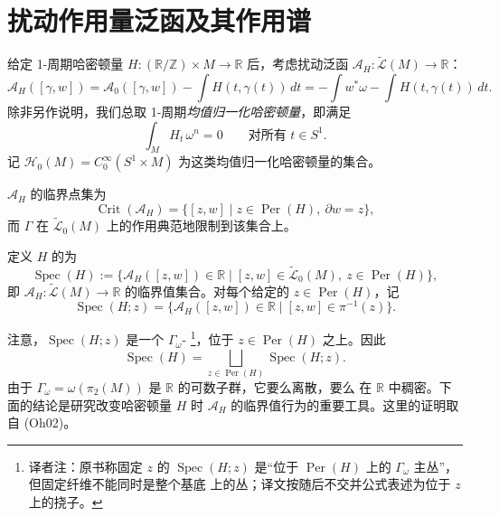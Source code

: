 \section{扰动作用量泛函及其作用谱}
\label{sec:perturbed-action-functionals-spectrum}

给定 1-周期哈密顿量 $H:(\mathbb R/\mathbb Z)\times M\to\mathbb R$ 后，考虑扰动泛函
$\mathcal A_H:\widetilde{\mathcal L}(M)\to\mathbb R$：
\begin{equation}
 \mathcal A_H([\gamma,w])
 =\mathcal A_0([\gamma,w])-\int H(t,\gamma(t))\,dt
 =-\int w^*\omega-\int H(t,\gamma(t))\,dt.
 \label{eq:18-perturbed-action-functional}
\end{equation}
除非另作说明，我们总取 1-周期\emph{均值归一化哈密顿量}，即满足
\begin{equation}
 \int_M H_t\,\omega^n=0\qquad\text{对所有 }t\in S^1.
 \label{eq:18-mean-normalized-hamiltonian}
\end{equation}
记 $\mathcal H_0(M)=C_0^\infty(S^1\times M)$ 为这类均值归一化哈密顿量的集合。

\begin{lemma}
\label{lem:18-critical-points-perturbed-action}
$\mathcal A_H$ 的临界点集为
\[
 \operatorname{Crit}(\mathcal A_H)
 =\{[z,w]\mid z\in\operatorname{Per}(H),\ \partial w=z\},
\]
而 $\Gamma$ 在 $\widetilde{\mathcal L}_0(M)$ 上的作用典范地限制到该集合上。
\end{lemma}

\begin{definition}
\label{def:18-action-spectrum}
定义 $H$ 的\emph{\termActionSpectrum{}}为
\[
 \operatorname{Spec}(H):=\{\mathcal A_H([z,w])\in\mathbb R\mid
 [z,w]\in\widetilde{\mathcal L}_0(M),\ z\in\operatorname{Per}(H)\},
\]
即 $\mathcal A_H:\widetilde{\mathcal L}(M)\to\mathbb R$ 的临界值集合。对每个给定的
$z\in\operatorname{Per}(H)$，记
\[
 \operatorname{Spec}(H;z)=\{\mathcal A_H([z,w])\in\mathbb R\mid
 [z,w]\in\pi^{-1}(z)\}.
\]
\end{definition}

注意，$\operatorname{Spec}(H;z)$ 是一个 $\Gamma_\omega$-\termTorsor{}
\footnote{译者注：原书称固定 $z$ 的 $\operatorname{Spec}(H;z)$ 是“位于
$\operatorname{Per}(H)$ 上的 $\Gamma_\omega$ 主丛”，但固定纤维不能同时是整个基底
上的丛；译文按随后不交并公式表述为位于 $z$ 上的挠子。}，位于
$z\in\operatorname{Per}(H)$ 之上。因此
\[
 \operatorname{Spec}(H)=\bigsqcup_{z\in\operatorname{Per}(H)}
 \operatorname{Spec}(H;z).
\]
由于 $\Gamma_\omega=\omega(\pi_2(M))$ 是 $\mathbb R$ 的可数子群，它要么离散，要么
在 $\mathbb R$ 中稠密。下面的结论是研究改变哈密顿量 $H$ 时
$\mathcal A_H$ 的临界值行为的重要工具。这里的证明取自 (Oh02)。


